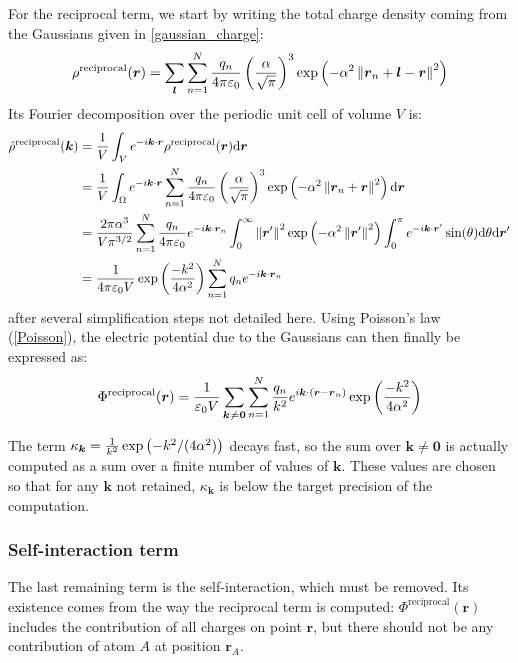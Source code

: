 \documentclass[main.tex]{subfiles}
\begin{document}
For the reciprocal term, we start by writing the total charge density coming from the Gaussians given in \autoref{gaussian_charge}:
\[\rho^\text{reciprocal}(\boldsymbol r) = \sum_{\boldsymbol l}\sum_{n=1}^N \frac{q_n}{4\pi\varepsilon_0}\left(\frac\alpha{\sqrt\pi}\right)^3\exp\left(-\alpha^2\left\|\boldsymbol r_n + \boldsymbol l - \boldsymbol r\right\|^2\right)\]
Its Fourier decomposition over the periodic unit cell of volume $V$ is:
\[\begin{split}
\hat\rho^\text{reciprocal}(\boldsymbol k) &= \frac1V\int_V e^{-i\boldsymbol k\cdot\boldsymbol r} \rho^\text{reciprocal}(\boldsymbol r)\text d\boldsymbol r
\\&= \frac1V\int_\Omega e^{-i\boldsymbol k\cdot\boldsymbol r} \sum_{n=1}^N \frac{q_n}{4\pi\varepsilon_0} \left(\frac\alpha{\sqrt\pi}\right)^3\exp\left(-\alpha^2\left\|\boldsymbol r_n + \boldsymbol r\right\|^2\right) \text d\boldsymbol r
\\&= \frac{2\pi\alpha^3}{V\pi^{3/2}} \sum_{n=1}^N \frac{q_n}{4\pi\varepsilon_0} e^{-i\boldsymbol k\cdot\boldsymbol r_n} \int_0^\infty \left\|\boldsymbol{r}'\right\|^2\exp\left(-\alpha^2 \left\|\boldsymbol{r}'\right\|^2\right)\int_0^\pi e^{-i\boldsymbol k\cdot\boldsymbol{r}'} \sin(\theta) \text d \theta \text d \boldsymbol{r}'
\\&= \frac1{4\pi\varepsilon_0V}\exp\left(\frac{-k^2}{4\alpha^2}\right)\sum_{n=1}^N q_n e^{-i\boldsymbol k\cdot\boldsymbol r_n}\end{split}\]
after several simplification steps not detailed here. Using Poisson's law (\autoref{Poisson}), the electric potential due to the Gaussians can then finally be expressed as:
\[\Phi^\text{reciprocal}(\boldsymbol r) = \frac{1}{\varepsilon_0V}\sum_{\boldsymbol k\not\kern0.2ex= \boldsymbol 0}\sum_{n=1}^N \frac{q_n}{k^2} e^{i\boldsymbol k\cdot\left(\boldsymbol r - \boldsymbol r_n\right)}\exp\left(\frac{-k^2}{4\alpha^2}\right)\label{eq:reciprocal}\]

The term $\kappa_{\boldsymbol{k}} = \frac1{k^2}\exp\left(-k^2/(4\alpha^2)\right)$ decays fast, so the sum over $\boldsymbol{k}\neq\boldsymbol{0}$ is actually computed as a sum over a finite number of values of $\boldsymbol{k}$. These values are chosen so that for any $\boldsymbol{k}$ not retained, $\kappa_{\boldsymbol{k}}$ is below the target precision of the computation.

\subsubsection{Self-interaction term}

The last remaining term is the self-interaction, which must be removed. Its existence comes from the way the reciprocal term is computed: $\Phi^\text{reciprocal}(\boldsymbol r)$ includes the contribution of all charges on point $\boldsymbol r$, but there should not be any contribution of atom $A$ at position $\boldsymbol r_A$.
\end{document}
